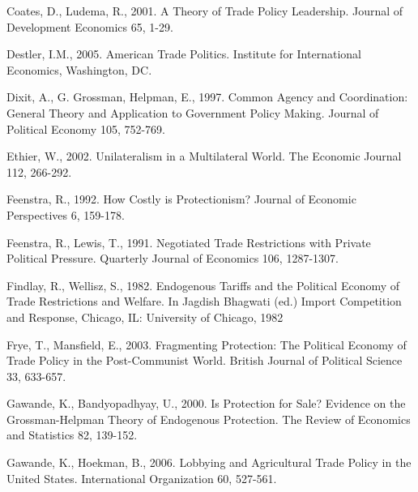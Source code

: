 \documentclass[10pt]{article}
\begin{document}
\begin{list}{}{\setlength{\leftmargin}{0.0in}\setlength{\rightmargin}{0.0in}\setlength{\itemindent}{0.0in}\setlength{\itemsep}{0.1in}}
\item Coates, D., Ludema, R., 2001. A Theory of Trade Policy Leadership. Journal of Development Economics 65, 1-29.


\item Destler, I.M., 2005. American Trade Politics. Institute for International Economics, Washington, DC.

\item Dixit, A., G. Grossman, Helpman, E., 1997. Common Agency and Coordination: General Theory and Application to Government Policy Making. Journal of Political Economy 105, 752-769.

\item Ethier, W., 2002. Unilateralism in a Multilateral World. The Economic Journal 112, 266-292.


\item Feenstra, R., 1992. How Costly is Protectionism? Journal of Economic Perspectives 6, 159-178.

\item Feenstra, R., Lewis, T., 1991. Negotiated Trade Restrictions with Private Political Pressure. Quarterly Journal of Economics 106, 1287-1307.

\item Findlay, R., Wellisz, S., 1982. Endogenous Tariffs and the Political Economy of Trade Restrictions and Welfare. In Jagdish Bhagwati (ed.) Import Competition and Response, Chicago, IL: University of Chicago, 1982

\item Frye, T., Mansfield, E., 2003. Fragmenting Protection: The Political Economy of Trade Policy in the Post-Communist World. British Journal of Political Science 33, 633-657.

\item Gawande, K., Bandyopadhyay, U., 2000. Is Protection for Sale? Evidence on the Grossman-Helpman Theory of Endogenous Protection. The Review of Economics and Statistics 82, 139-152.

\item Gawande, K., Hoekman, B., 2006. Lobbying and Agricultural Trade Policy in the United States. International Organization 60, 527-561.


\end{list}
\end{document}
